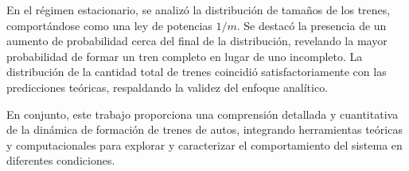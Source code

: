 \documentclass[letterpaper,12pt]{article}
\theoremstyle{plain}
\begin{document}
En el régimen estacionario, se analizó la distribución de tamaños de los trenes, comportándose como una ley de potencias $1/m$. Se destacó la presencia de un aumento de probabilidad cerca del final de la distribución, revelando la mayor probabilidad de formar un tren completo en lugar de uno incompleto. La distribución de la cantidad total de trenes coincidió satisfactoriamente con las predicciones teóricas, respaldando la validez del enfoque analítico.

En conjunto, este trabajo proporciona una comprensión detallada y cuantitativa de la dinámica de formación de trenes de autos, integrando herramientas teóricas y computacionales para explorar y caracterizar el comportamiento del sistema en diferentes condiciones.







\end{document}

